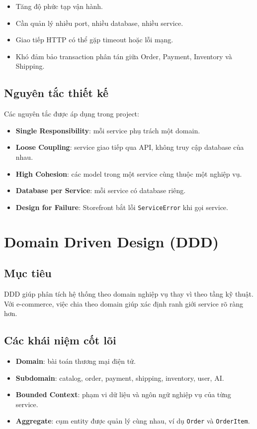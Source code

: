 \documentclass[12pt,a4paper]{report}
\begin{document}
\begin{itemize}
  \item Tăng độ phức tạp vận hành.
  \item Cần quản lý nhiều port, nhiều database, nhiều service.
  \item Giao tiếp HTTP có thể gặp timeout hoặc lỗi mạng.
  \item Khó đảm bảo transaction phân tán giữa Order, Payment, Inventory và Shipping.
\end{itemize}

\subsection{Nguyên tắc thiết kế}

Các nguyên tắc được áp dụng trong project:

\begin{itemize}
  \item \textbf{Single Responsibility}: mỗi service phụ trách một domain.
  \item \textbf{Loose Coupling}: service giao tiếp qua API, không truy cập database của nhau.
  \item \textbf{High Cohesion}: các model trong một service cùng thuộc một nghiệp vụ.
  \item \textbf{Database per Service}: mỗi service có database riêng.
  \item \textbf{Design for Failure}: Storefront bắt lỗi \texttt{ServiceError} khi gọi service.
\end{itemize}

\section{Domain Driven Design (DDD)}

\subsection{Mục tiêu}

DDD giúp phân tích hệ thống theo domain nghiệp vụ thay vì theo tầng kỹ thuật. Với e-commerce, việc chia theo domain giúp xác định ranh giới service rõ ràng hơn.

\subsection{Các khái niệm cốt lõi}

\begin{itemize}
  \item \textbf{Domain}: bài toán thương mại điện tử.
  \item \textbf{Subdomain}: catalog, order, payment, shipping, inventory, user, AI.
  \item \textbf{Bounded Context}: phạm vi dữ liệu và ngôn ngữ nghiệp vụ của từng service.
  \item \textbf{Aggregate}: cụm entity được quản lý cùng nhau, ví dụ \texttt{Order} và \texttt{OrderItem}.
\end{itemize}
\end{document}
